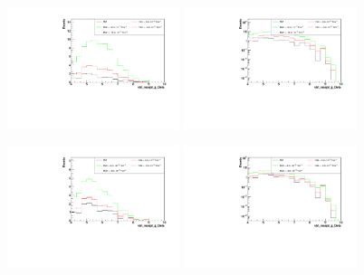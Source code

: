 \begin{figure}[h]
  \begin{center}
	\includegraphics[width=0.45\textwidth]{Plots/aQGC_kinematics/vbf_maxpt_jj_Deta_FM1.pdf}%
	\includegraphics[width=0.45\textwidth]{Plots/aQGC_kinematics/vbf_maxpt_jj_Deta_FM1_log.pdf}\\
    \caption{}
  \end{center}
\end{figure}
\begin{figure}[h]
  \begin{center}
	\includegraphics[width=0.45\textwidth]{Plots/aQGC_kinematics/vbf_maxpt_jj_Deta_FM6.pdf}%
	\includegraphics[width=0.45\textwidth]{Plots/aQGC_kinematics/vbf_maxpt_jj_Deta_FM6_log.pdf}\\
    \caption{}
  \end{center}
\end{figure}
